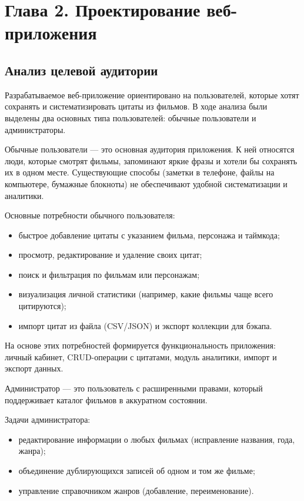 \section*{Глава 2. Проектирование веб-приложения}


\subsection{Анализ целевой аудитории}

Разрабатываемое веб-приложение ориентировано на пользователей, которые хотят 
сохранять и систематизировать цитаты из фильмов. В ходе анализа были выделены два 
основных типа пользователей: обычные пользователи и администраторы.

Обычные пользователи — это основная аудитория приложения. К ней относятся люди, 
которые смотрят фильмы, запоминают яркие фразы и хотели бы сохранять их в одном месте. 
Существующие способы (заметки в телефоне, файлы на компьютере, бумажные блокноты) 
не обеспечивают удобной систематизации и аналитики.

Основные потребности обычного пользователя:
\begin{itemize}
    \item быстрое добавление цитаты с указанием фильма, персонажа и таймкода;
    \item просмотр, редактирование и удаление своих цитат;
    \item поиск и фильтрация по фильмам или персонажам;
    \item визуализация личной статистики (например, какие фильмы чаще всего цитируются);
    \item импорт цитат из файла (CSV/JSON) и экспорт коллекции для бэкапа.
\end{itemize}

На основе этих потребностей формируется функциональность приложения: личный кабинет, 
CRUD-операции с цитатами, модуль аналитики, импорт и экспорт данных.

Администратор — это пользователь с расширенными правами, который поддерживает каталог 
фильмов в аккуратном состоянии.

Задачи администратора:
\begin{itemize}
    \item редактирование информации о любых фильмах (исправление названия, года, жанра);
    \item объединение дублирующихся записей об одном и том же фильме;
    \item управление справочником жанров (добавление, переименование).
\end{itemize}

